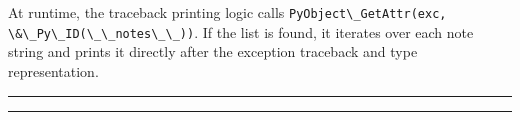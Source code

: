 At runtime, the traceback printing logic calls
\passthrough{\lstinline!PyObject\_GetAttr(exc, \&\_Py\_ID(\_\_notes\_\_))!}.
If the list is found, it iterates over each note string and prints it
directly after the exception traceback and type representation.

\begin{center}\rule{0.5\linewidth}{0.5pt}\end{center}

\begin{center}\rule{0.5\linewidth}{0.5pt}\end{center}
